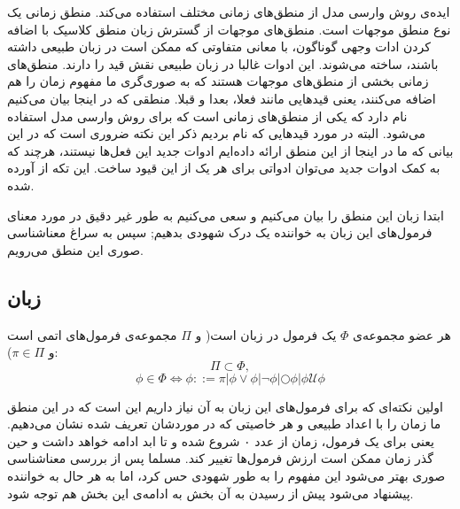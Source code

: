 ایده‌ی روش وارسی مدل از منطق‌های زمانی مختلف استفاده می‌کند. منطق زمانی یک نوع منطق موجهات است. منطق‌های موجهات از گسترش زبان منطق کلاسیک با اضافه کردن ادات وجهی گوناگون، با معانی متفاوتی که ممکن است در زبان طبیعی داشته باشند، ساخته می‌شوند. این ادوات غالبا در زبان طبیعی نقش قید را دارند. منطق‌های زمانی بخشی از منطق‌های موجهات هستند که به صوری‌گری ما مفهوم زمان را هم اضافه می‌کنند، یعنی قیدهایی مانند فعلا، بعدا و قبلا. منطقی که در اینجا بیان می‌کنیم  نام دارد که یکی از منطق‌های زمانی است که برای روش وارسی مدل استفاده می‌شود. البته در مورد قیدهایی که نام بردیم ذکر این نکته ضروری است که در این بیانی که ما در اینجا از این منطق ارائه داده‌ایم ادوات جدید این فعل‌ها نیستند، هرچند که به کمک ادوات جدید می‌توان ادواتی برای هر یک از این قیود ساخت.
این تکه از \cite{buchi} آورده شده.

ابتدا زبان این منطق را بیان می‌کنیم و سعی می‌کنیم به طور غیر دقیق در مورد معنای فرمول‌های این زبان به خواننده یک درک شهودی بدهیم; سپس به سراغ معناشناسی صوری این منطق می‌رویم.

\subsection{زبان }
\begin{defn}
	هر عضو مجموعه‌ی $\Phi$ یک فرمول در زبان  است( و $\Pi$ مجموعه‌ی فرمول‌های اتمی است و $\pi \in \Pi$):
	$$
	\Pi \subset \Phi,
	$$
	$$
	\phi \in \Phi \Leftrightarrow
	\phi ::= \pi | \phi \lor \phi |
	\neg \phi |
	\bigcirc \phi |
	\phi \mathcal{U}\phi 
$$	
	
\end{defn}
اولین نکته‌ای که برای فرمول‌های این زبان به آن نیاز داریم این است که در این منطق ما زمان را با اعداد طبیعی و هر خاصیتی که در موردشان تعریف شده نشان می‌دهیم. یعنی برای یک فرمول، زمان از عدد ۰ شروع شده و تا ابد ادامه خواهد داشت و حین گذر زمان ممکن است ارزش فرمول‌ها تغییر کند. مسلما پس از بررسی معناشناسی صوری بهتر می‌شود این مفهوم را به طور شهودی حس کرد، اما به هر حال به خواننده پیشنهاد می‌شود پیش از رسیدن به آن بخش به ادامه‌ی این بخش هم توجه شود. 

